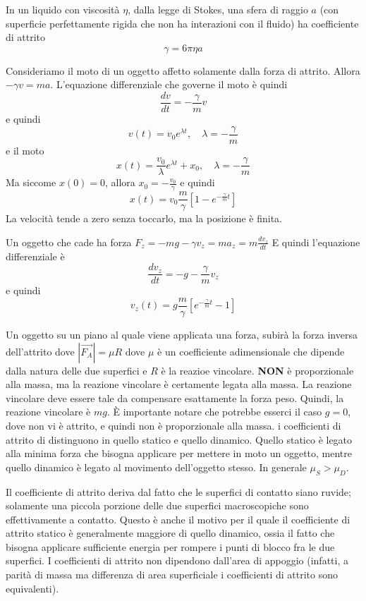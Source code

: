 \documentclass[a4paper]{article}
\begin{document}
In un liquido con viscosità \(\eta\), dalla legge di Stokes,
una sfera di raggio \(a\) (con superficie perfettamente rigida che non ha
interazioni con il fluido) ha coefficiente di attrito
\[
    \gamma = 6\pi\eta a
\]

Consideriamo il moto di un oggetto affetto solamente dalla forza di attrito.
Allora \(-\gamma v = ma\). L'equazione differenziale che governe il moto è quindi
\[
    \frac{dv}{dt} = -\frac{\gamma}{m}v
\]
e quindi
\[
    v(t) = v_0e^{\lambda t}, \quad \lambda = -\frac{\gamma}{m}
\]
e il moto
\[
    x(t) = \frac{v_0}{\lambda} e^{\lambda t} + x_0, \quad \lambda = -\frac{\gamma}{m}
\]
Ma siccome \(x(0) = 0\), allora \(x_0 = - \frac{v_0}{\gamma}\)
e quindi
\[ x(t) = v_0 \frac{m}{\gamma} \left[1 - e^{-\frac{\gamma}{m}t}\right] \]
La velocità tende a zero senza toccarlo, ma la posizione è finita.

Un oggetto che cade ha forza \(F_z = -mg - \gamma v_z = ma_z = m\frac{dv_z}{dt}\)
E quindi l'equazione differenziale è
\[
    \frac{dv_z}{dt} = -g - \frac{\gamma}{m} v_z
\]
e quindi
\[
    v_z(t) = g\frac{m}{\gamma} \left[e^{-\frac{\gamma}{m}t} - 1\right]
\]

Un oggetto su un piano al quale viene applicata una forza, subirà la forza inversa
dell'attrito dove \(|\vec{F_A}| = \mu R\)
dove \(\mu\) è un coefficiente adimensionale che dipende dalla natura delle due superfici
e \(R\) è la reazioe vincolare. \textbf{NON} è proporzionale alla massa, ma la reazione vincolare
è certamente legata alla massa. La reazione vincolare deve essere tale da compensare esattamente
la forza peso. Quindi, la reazione vincolare è \(mg\). È importante notare che potrebbe
esserci il caso \(g=0\), dove non vi è attrito, e quindi non è proporzionale alla massa.
i coefficienti di attrito di distinguono in quello statico e quello dinamico.
Quello statico è legato alla minima forza che bisogna applicare per mettere in moto un oggetto,
mentre quello dinamico è legato al movimento dell'oggetto stesso.
In generale \(\mu_S > \mu_D\).

Il coefficiente di attrito deriva dal fatto che le superfici di contatto siano
ruvide; solamente una piccola porzione delle due superfici macroscopiche sono effettivamente a contatto.
Questo è anche il motivo per il quale il coefficiente di attrito statico è generalmente maggiore
di quello dinamico, ossia il fatto che bisogna applicare sufficiente energia per rompere
i punti di blocco fra le due superfici. I coefficienti di attrito
non dipendono dall'area di appoggio (infatti, a parità di massa ma differenza di area
superficiale i coefficienti di attrito sono equivalenti).
\end{document}
